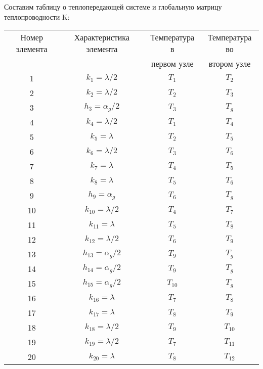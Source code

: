 \documentclass[a4paper, 12pt]{article}
\begin{document}
Составим таблицу о теплопередающей системе и глобальную матрицу теплопроводности K:
\begin{table}[h]
    \centering
    \begin{tabular}{|c|c|c|c|}
        \toprule
        Номер элемента & Характеристика элемента & Температура в & Температура во \\ 
        & & первом узле & втором узле\\ 
        \midrule
        1 & $k_1 = \lambda/2$ & $T_1$ & $T_2$\\
         \midrule
        2 & $k_2 = \lambda/2$ & $T_2$ & $T_3$\\
         \midrule
        3 & $h_3 = \alpha_g/2$ & $T_3$ & $T_g$\\
        \midrule
        4 & $k_4 = \lambda/2$ & $T_1$ & $T_4$\\
        \midrule
        5 & $k_5 = \lambda$ & $T_2$ & $T_5$\\
        \midrule
        6 & $k_6 = \lambda/2$ & $T_3$ & $T_6$\\
        \midrule
        7 & $k_7 = \lambda$ & $T_4$ & $T_5$\\
        \midrule
        8 & $k_8 = \lambda$ & $T_5$ & $T_6$\\
        \midrule
        9 & $h_9 = \alpha_g$ & $T_6$ & $T_g$\\
        \midrule
        10 & $k_{10} = \lambda/2$ & $T_4$ & $T_7$\\
        \midrule
        11 & $k_{11} = \lambda$ & $T_5$ & $T_8$\\
        \midrule
        12 & $k_{12} = \lambda/2$ & $T_6$ & $T_9$\\
        \midrule
        13 & $h_{13} = \alpha_g/2$ & $T_9$ & $T_g$\\
        \midrule
        14 & $h_{14} = \alpha_g/2$ & $T_9$ & $T_g$\\
        \midrule
        15 & $h_{15} = \alpha_g/2$ & $T_{10}$ & $T_g$\\
        \midrule
        16 & $k_{16} = \lambda$ & $T_7$ & $T_8$\\
        \midrule
        17 & $k_{17} = \lambda$ & $T_8$ & $T_9$\\
        \midrule
        18 & $k_{18} = \lambda/2$ & $T_9$ & $T_{10}$\\
        \midrule
        19 & $k_{19} = \lambda/2$ & $T_7$ & $T_{11}$\\
        \midrule
        20 & $k_{20} = \lambda$ & $T_8$ & $T_{12}$\\
        \midrule

\end{tabular}
\end{table}
\end{document}
